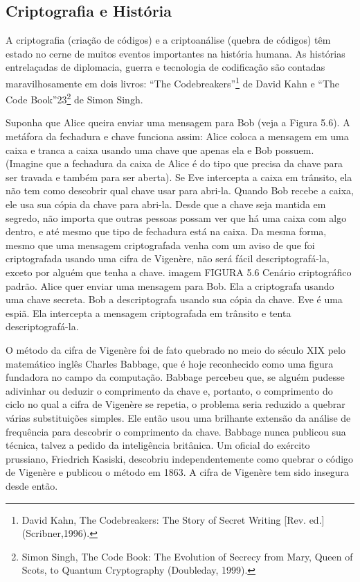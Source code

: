 \documentclass{book}
\begin{document}

\subsection{Criptografia e História}
\label{segredos:crip-his}

A criptografia (criação de códigos) e a criptoanálise (quebra de códigos) têm estado no cerne de muitos eventos importantes na história humana. As histórias entrelaçadas de diplomacia, guerra e tecnologia de codificação são contadas maravilhosamente em dois livros: ``The Codebreakers''\footnote{David Kahn, The Codebreakers: The Story of Secret Writing [Rev. ed.] (Scribner,1996).} de David Kahn e ``The Code Book''23\footnote{Simon Singh, The Code Book: The Evolution of Secrecy from Mary, Queen of Scots, to Quantum Cryptography (Doubleday, 1999).} de Simon Singh.

Suponha que Alice queira enviar uma mensagem para Bob (veja a Figura 5.6). A metáfora da fechadura e chave funciona assim: Alice coloca a mensagem em uma caixa e tranca a caixa usando uma chave que apenas ela e Bob possuem. (Imagine que a fechadura da caixa de Alice é do tipo que precisa da chave para ser travada e também para ser aberta). Se Eve intercepta a caixa em trânsito, ela não tem como descobrir qual chave usar para abri-la. Quando Bob recebe a caixa, ele usa sua cópia da chave para abri-la. Desde que a chave seja mantida em segredo, não importa que outras pessoas possam ver que há uma caixa com algo dentro, e até mesmo que tipo de fechadura está na caixa. Da mesma forma, mesmo que uma mensagem criptografada venha com um aviso de que foi criptografada usando uma cifra de Vigenère, não será fácil descriptografá-la, exceto por alguém que tenha a chave.
imagem
FIGURA 5.6 Cenário criptográfico padrão. Alice quer enviar uma mensagem para Bob. Ela a criptografa usando uma chave secreta. Bob a descriptografa usando sua cópia da chave. Eve é uma espiã. Ela intercepta a mensagem criptografada em trânsito e tenta descriptografá-la.

O método da cifra de Vigenère foi de fato quebrado no meio do século XIX pelo matemático inglês Charles Babbage, que é hoje reconhecido como uma figura fundadora no campo da computação. Babbage percebeu que, se alguém pudesse adivinhar ou deduzir o comprimento da chave e, portanto, o comprimento do ciclo no qual a cifra de Vigenère se repetia, o problema seria reduzido a quebrar várias substituições simples. Ele então usou uma brilhante extensão da análise de frequência para descobrir o comprimento da chave. Babbage nunca publicou sua técnica, talvez a pedido da inteligência britânica. Um oficial do exército prussiano, Friedrich Kasiski, descobriu independentemente como quebrar o código de Vigenère e publicou o método em 1863. A cifra de Vigenère tem sido insegura desde então.
\end{document}
